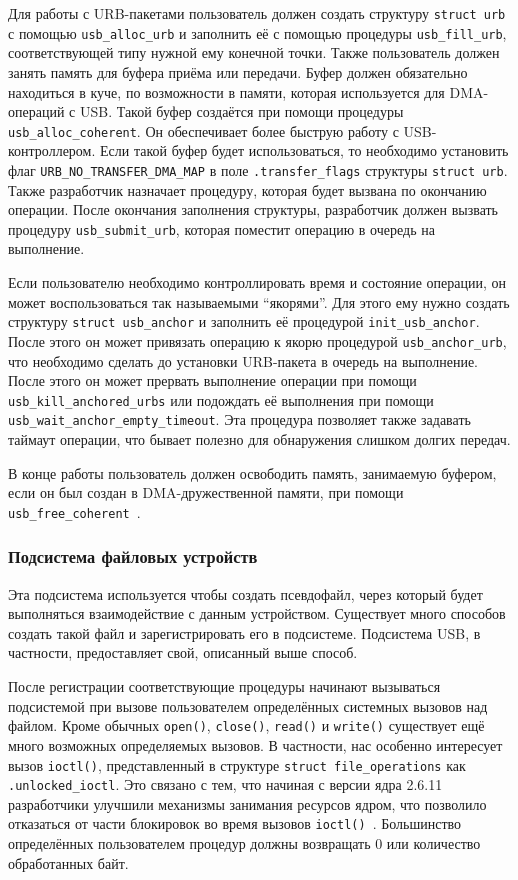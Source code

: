 \documentclass[a4paper,12pt]{report}
\numberwithin{equation}{section}
\begin{document}
Для работы с URB-пакетами пользователь должен создать структуру \texttt{struct
  urb} с помощью \texttt{usb\_alloc\_urb} и заполнить её с помощью процедуры
\texttt{usb\_fill\_urb}, соответствующей типу нужной ему конечной точки. Также
пользователь должен занять память для буфера приёма или передачи. Буфер должен
обязательно находиться в куче, по возможности в памяти, которая используется для
DMA-операций с USB. Такой буфер создаётся при помощи процедуры
\texttt{usb\_alloc\_coherent}. Он обеспечивает более быструю работу с
USB-контроллером. Если такой буфер будет использоваться, то необходимо
установить флаг \texttt{URB\_NO\_TRANSFER\_DMA\_MAP} в поле
\texttt{.transfer\_flags} структуры \texttt{struct urb}. Также разработчик
назначает процедуру, которая будет вызвана по окончанию операции. После
окончания заполнения структуры, разработчик должен вызвать процедуру
\texttt{usb\_submit\_urb}, которая поместит операцию в очередь на выполнение.

Если пользователю необходимо контроллировать время и состояние операции, он
может воспользоваться так называемыми ``якорями''. Для этого ему нужно создать
структуру \texttt{struct usb\_anchor} и заполнить её процедурой
\texttt{init\_usb\_anchor}. После этого он может привязать операцию к якорю
процедурой \texttt{usb\_anchor\_urb}, что необходимо сделать до установки
URB-пакета в очередь на выполнение. После этого он может прервать выполнение
операции при помощи \texttt{usb\_kill\_anchored\_urbs} или подождать её
выполнения при помощи \texttt{usb\_wait\_anchor\_empty\_timeout}. Эта процедура
позволяет также задавать таймаут операции, что бывает полезно для обнаружения
слишком долгих передач.

В конце работы пользователь должен освободить память, занимаемую буфером, если
он был создан в DMA-дружественной памяти, при помощи
\texttt{usb\_free\_coherent}~\cite{usbskel}.

\subsubsection{Подсистема файловых устройств}
Эта подсистема используется чтобы создать псевдофайл, через который будет
выполняться взаимодействие с данным устройством. Существует много способов
создать такой файл и зарегистрировать его в подсистеме. Подсистема USB, в
частности, предоставляет свой, описанный выше способ.

После регистрации соответствующие процедуры начинают вызываться подсистемой при
вызове пользователем определённых системных вызовов над файлом. Кроме обычных
\texttt{open()}, \texttt{close()}, \texttt{read()} и \texttt{write()} существует
ещё много возможных определяемых вызовов. В частности, нас особенно интересует
вызов \texttt{ioctl()}, представленный в структуре \texttt{struct
  file\_operations} как \texttt{.unlocked\_ioctl}. Это связано с тем, что
начиная с версии ядра 2.6.11 разработчики улучшили механизмы занимания ресурсов
ядром, что позволило отказаться от части блокировок во время вызовов
\texttt{ioctl()}~\cite{newioctl}. Большинство определённых пользователем
процедур должны возвращать 0 или количество обработанных байт.
\end{document}
